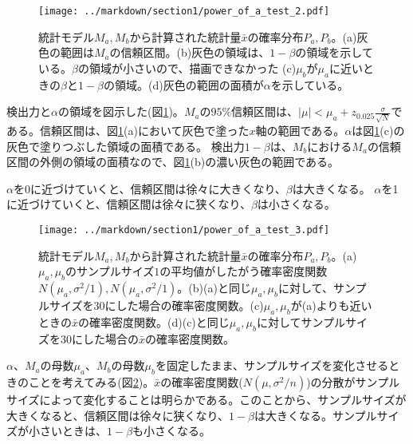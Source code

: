 \documentclass[a4paper,11pt,dvipdfmx]{jsarticle}
\begin{document}
\begin{figure}
\begin{center}
    \texttt{[image: ../markdown/section1/power\_of\_a\_test\_2.pdf]}
    \caption{統計モデル$M_a,M_b$から計算された統計量$\bar{x}$の確率分布$P_a,P_b$。(a)灰色の範囲は$M_a$の信頼区間。(b)灰色の領域は、$1-\beta$の領域を示している。$\beta$の領域が小さいので、描画できなかった (c)$\mu_b$が$\mu_a$に近いときの$\beta$と$1-\beta$の領域。(d)灰色の範囲の面積が$\alpha$を示している。}
    \label{fig:power_of_test_alpha_beta}
\end{center}
\end{figure}


検出力と$\alpha$の領域を図示した(図\ref{fig:power_of_test_alpha_beta})。$M_a$の$95\%$信頼区間は、$|\mu|<\mu_a+z_{0.025}\frac{\sigma}{\sqrt{N}}$である。信頼区間は、図\ref{fig:power_of_test_alpha_beta}(a)において灰色で塗った$x$軸の範囲である。$\alpha$は図\ref{fig:power_of_test_alpha_beta}(c)の灰色で塗りつぶした領域の面積である。
検出力$1-\beta$は、$M_b$における$M_a$の信頼区間の外側の領域の面積なので、図\ref{fig:power_of_test_alpha_beta}(b)の濃い灰色の範囲である。

$\alpha$を0に近づけていくと、信頼区間は徐々に大きくなり、$\beta$は大きくなる。
$\alpha$を1に近づけていくと、信頼区間は徐々に狭くなり、$\beta$は小さくなる。



\begin{figure}
    \begin{center}
        \texttt{[image: ../markdown/section1/power\_of\_a\_test\_3.pdf]}
        \caption{統計モデル$M_a,M_b$から計算された統計量$\bar{x}$の確率分布$P_a,P_b$。(a)$\mu_a,\mu_b$のサンプルサイズ$1$の平均値がしたがう確率密度関数$N(\mu_a,\sigma^2/1),N(\mu_a,\sigma^2/1)$。(b)(a)と同じ$\mu_a,\mu_b$に対して、サンプルサイズを$30$にした場合の確率密度関数。(c)$\mu_a,\mu_b$が(a)よりも近いときの$\bar{x}$の確率密度関数。(d)(c)と同じ$\mu_a,\mu_b$に対してサンプルサイズを$30$にした場合の$\bar{x}$の確率密度関数。}
        \label{fig:power_of_test_alpha_beta_sample_size}
    \end{center}
    \end{figure}

    

$\alpha$、$M_a$の母数$\mu_a$、$M_b$の母数$\mu_b$を固定したまま、サンプルサイズを変化させるときのことを考えてみる(図\ref{fig:power_of_test_alpha_beta_sample_size})。$\bar{x}$の確率密度関数($N(\mu,\sigma^2/n)$)の分散がサンプルサイズによって変化することは明らかである。このことから、サンプルサイズが大きくなると、信頼区間は徐々に狭くなり、$1-\beta$は大きくなる。サンプルサイズが小さいときは、$1-\beta$も小さくなる。
\end{document}
